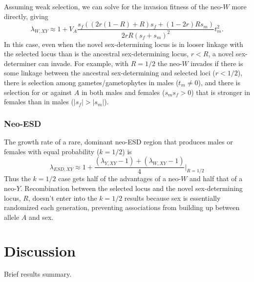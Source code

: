 \documentclass[12pt]{article}
\begin{document}
Assuming weak selection, we can solve for the invasion fitness of the neo-$W$ more directly, giving
\begin{equation}
\lambda_{W,XY} \approx 1 + V_A \frac{s_f \left( (2 r (1-R) +R) s_f + (1- 2r) R s_m \right)}{2 r R \left( s_f + s_m \right)^2} t_m^2.
\end{equation}
In this case, even when the novel sex-determining locus is in looser linkage with the selected locus than is the ancestral sex-determining locus, $r<R$, a novel sex-determiner can invade.
For example, with $R=1/2$ the neo-$W$ invades if there is some linkage between the ancestral sex-determining and selected loci ($r<1/2$), there is selection among gametes/gametophytes in males ($t_m\neq0$), and there is selection for or against $A$ in both males and females ($s_m s_f >0$) that is stronger in females than in males ($|s_f| > |s_m|$).

\subsubsection*{Neo-ESD}

The growth rate of a rare, dominant neo-ESD region that produces males or females with equal probability ($k=1/2$) is
\begin{equation}
\lambda_{ESD,XY} \approx 1 + \frac{(\lambda_{Y,XY} - 1) + (\lambda_{W,XY} -1)}{4} \Big|_{R=1/2}
\end{equation}
Thus the $k=1/2$ case gets half of the advantages of a neo-$W$ and half that of a neo-$Y$.  
Recombination between the selected locus and the novel sex-determining locus, $R$, doesn't enter into the $k=1/2$ results because sex is essentially randomized each generation, %
preventing associations from building up between allele $A$ and sex.  

\linenumbers
\modulolinenumbers[2]

\section*{Discussion}

Brief results summary. 
\end{document}
